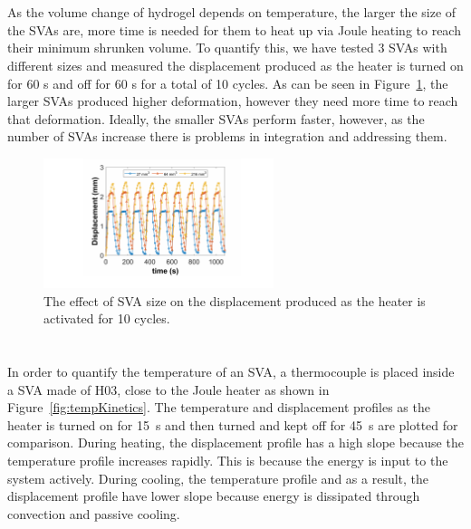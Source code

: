 \section{}
As the volume change of hydrogel depends on temperature, the larger the size of the SVAs are, more time is needed for them to heat up via Joule heating to reach their minimum shrunken volume. To quantify this, we have tested 3 SVAs with different sizes and measured the displacement produced as the heater is turned on for 60 s and off for 60 s for a total of 10 cycles. As can be seen in Figure~\ref{fig:svaSize}, the larger SVAs produced higher deformation, however they need more time to reach that deformation. Ideally, the smaller SVAs perform faster, however, as the number of SVAs increase there is problems in integration and addressing them.
\begin{figure}[!htb]
      \centering
      \includegraphics[width=0.6\textwidth]{svaSize.pdf}
      \caption[]{The effect of SVA size on the displacement produced as the heater is activated for 10 cycles.}
      \label{fig:svaSize}
\end{figure}

\section{} 
In order to quantify the temperature of an SVA, a thermocouple is placed inside a SVA made of H03, close to the Joule heater as shown in Figure~\ref{fig:tempKinetics}. The temperature and displacement profiles as the heater is turned on for 15~s and then turned and kept off for 45~s are plotted for comparison. During heating, the displacement profile has a high slope because the temperature profile increases rapidly. This is because the energy is input to the system actively. During cooling, the temperature profile and as a result, the displacement profile have lower slope because energy is dissipated through convection and passive cooling.		

